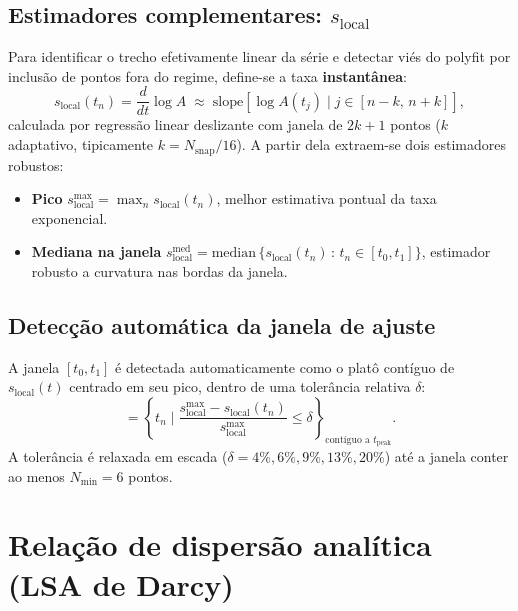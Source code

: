 \documentclass[11pt,a4paper]{article}
\begin{document}
\subsection{Estimadores complementares: $s_{\mathrm{local}}$}

Para identificar o trecho efetivamente linear da série e detectar viés
do polyfit por inclusão de pontos fora do regime, define-se a taxa
\textbf{instantânea}:
\begin{equation}
    s_{\mathrm{local}}(t_n) = \frac{d}{dt}\log A
    \;\approx\;
    \mathrm{slope}\!\left[ \log A(t_j)\;|\;j\in[n-k,\,n+k] \right],
    \label{eq:sloc}
\end{equation}
calculada por regressão linear deslizante com janela de $2k+1$ pontos
($k$ adaptativo, tipicamente $k = N_{\mathrm{snap}}/16$). A partir dela
extraem-se dois estimadores robustos:

\begin{itemize}
    \item \textbf{Pico}\quad
    $s_{\mathrm{local}}^{\max} = \max_n s_{\mathrm{local}}(t_n)$, melhor
    estimativa pontual da taxa exponencial.

    \item \textbf{Mediana na janela}\quad
    $s_{\mathrm{local}}^{\mathrm{med}} = \mathrm{median}\,\{s_{\mathrm{local}}(t_n)\,:\,t_n\in[t_0,t_1]\}$,
    estimador robusto a curvatura nas bordas da janela.
\end{itemize}

\subsection{Detecção automática da janela de ajuste}

A janela $[t_0,t_1]$ é detectada automaticamente como o platô contíguo de
$s_{\mathrm{local}}(t)$ centrado em seu pico, dentro de uma tolerância
relativa $\delta$:
\begin{equation}
    [t_0, t_1] = \left\{ t_n \;\bigg|\;
    \frac{s_{\mathrm{local}}^{\max} - s_{\mathrm{local}}(t_n)}{s_{\mathrm{local}}^{\max}} \le \delta \right\}_{\text{contíguo a }t_{\mathrm{peak}}}.
\end{equation}
A tolerância é relaxada em escada ($\delta = 4\%, 6\%, 9\%, 13\%, 20\%$)
até a janela conter ao menos $N_{\min} = 6$ pontos.

\section{Relação de dispersão analítica (LSA de Darcy)}
\end{document}
